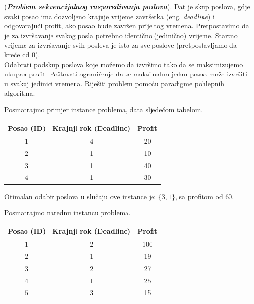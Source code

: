 \begin{example} (\textbf{\textit{Problem sekvencijalnog raspoređivanja poslova}}). Dat je skup  poslova, gdje svaki posao ima dozvoljeno krajnje
	vrijeme završetka (eng. \textit{deadline}) i odgovarajući profit, ako  posao bude završen 
	prije tog vremena. Pretpostavimo da je za izvršavanje svakog posla  potrebno identično (jedinično)
	vrijeme. Startno vrijeme za izvršavanje svih poslova je isto za sve poslove (pretpostavljamo da kreće od 0). \\
	
	  Odabrati podskup poslova koje možemo da izvršimo tako da se maksimi\-zujemo ukupan profit. Poštovati  ograničenje da se maksimalno jedan
	posao može izvršiti u svakoj jedinici vremena. Riješiti problem pomoću paradigme pohlepnih algoritma. 
\end{example} 

\begin{solution}
	Posmatrajmo primjer instance problema, data sljedećom tabelom.
\begin{center}
 
 
	\begin{tabular}{ccc }
	 \centering
	Posao (ID) & Krajnji rok (Deadline) & Profit \\ \hline \hline
	$1$	&	4	&	20 \\
	$2$	&	1	&	10\\
	$3$	&	1	&	40\\
	$4$	&	1	&	30\\ \hline
	\end{tabular}
\end{center}

Otimalan odabir poslova u slučaju ove instance je: $\{3, 1\}$, sa profitom od 60. 

Posmatrajmo narednu instancu problema.  
\begin{center}
	
	
	\begin{tabular}{ccc }
		\centering
		Posao (ID) & Krajnji rok (Deadline) & Profit \\ \hline \hline
		$1$	&	2	&	100 \\
		$2$	&	1	&	19\\
		$3$	&	2	&	27\\
		$4$	&	1	&	25\\  
	 $5$	&	3	&	15\\   \hline
	\end{tabular}
\end{center}
	
\end{solution}

